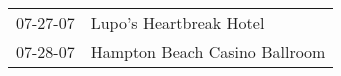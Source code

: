 \begin{supertabular}{p{0.25\columnwidth}p{0.75\columnwidth}}
 07-27-07 &        Lupo's Heartbreak Hotel \\
 07-28-07 &  Hampton Beach Casino Ballroom \\
\end{supertabular}
